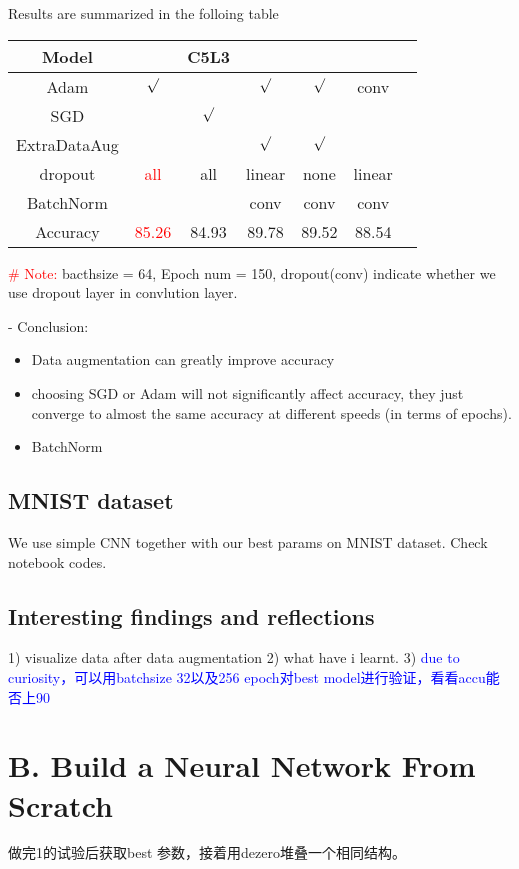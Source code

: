\documentclass{article}
\newcommand{\subs}[1]{\subsection*{#1}}
\newcommand{\secs}[1]{\section*{#1}}
\begin{document}
\noindent Results are summarized in the folloing table
\begin{center}
  \begin{tabular}{|c|ccccc|c|} 
      \hline
      Model & & C5L3 & & & &   \\
      \hline
      Adam &  \textcolor{red}{ $\surd$ }   &  & $\surd$ & $\surd$ &conv  &\\ 
      SGD & & $\surd$   & & &  &\\

      ExtraDataAug& &  & $\surd$ &  $\surd$ &  &\\

      dropout &\textcolor{red}{all} & all   & linear& none & linear  & \\ 

      BatchNorm & & &conv &conv  & conv & \\ 
      \hline
      Accuracy & \textcolor{red}{85.26} &84.93 &89.78 & 89.52& 88.54 & \\
      \hline
  \end{tabular} 
\end{center}
\textcolor{red}{\# Note:} bacthsize = 64, Epoch num = 150, dropout(conv) indicate whether we use dropout layer in convlution layer.

\noindent - Conclusion: 
\begin{itemize}
  \item Data augmentation can greatly improve accuracy
  \item choosing SGD or Adam will not significantly affect accuracy, they just converge to almost the same accuracy at different speeds (in terms of epochs).
  \item BatchNorm
\end{itemize}







\subs{MNIST dataset}
We use simple CNN together with our best params on MNIST dataset. Check notebook codes.


\subs{Interesting findings and reflections}
1) visualize data after data augmentation
2) what have i learnt.
3) \textcolor{blue}{due to curiosity，可以用batchsize 32以及256 epoch对best model进行验证，看看accu能否上90}


\secs{B. Build a Neural Network From Scratch}
做完1的试验后获取best 参数，接着用dezero堆叠一个相同结构。
\end{document}
